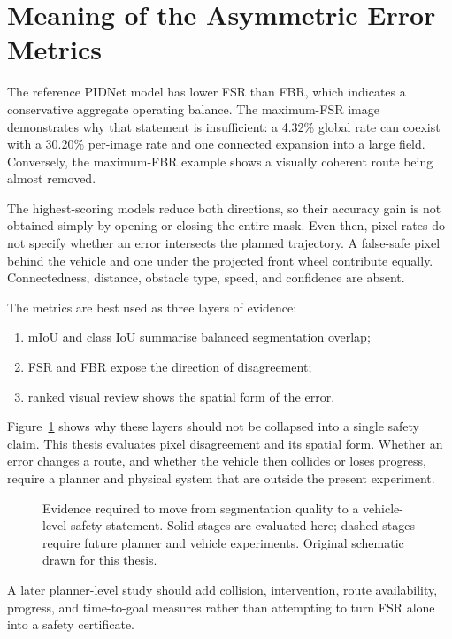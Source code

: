 \section{Meaning of the Asymmetric Error Metrics}

The reference PIDNet model has lower FSR than FBR, which indicates a conservative
aggregate operating balance. The maximum-FSR image demonstrates why that
statement is insufficient: a 4.32\% global rate can coexist with a 30.20\%
per-image rate and one connected expansion into a large field. Conversely, the
maximum-FBR example shows a visually coherent route being almost removed.

The highest-scoring models reduce both directions, so their accuracy gain is not
obtained simply by opening or closing the entire mask. Even then, pixel rates
do not specify whether an error intersects the planned trajectory. A false-safe
pixel behind the vehicle and one under the projected front wheel contribute
equally. Connectedness, distance, obstacle type, speed, and confidence are
absent.

The metrics are best used as three layers of evidence:
\begin{enumerate}
  \item mIoU and class IoU summarise balanced segmentation overlap;
  \item FSR and FBR expose the direction of disagreement;
  \item ranked visual review shows the spatial form of the error.
\end{enumerate}

Figure~\ref{fig:safety_evidence_ladder} shows why these layers should not be
collapsed into a single safety claim. This thesis evaluates pixel disagreement
and its spatial form. Whether an error changes a route, and whether the vehicle
then collides or loses progress, require a planner and physical system that are
outside the present experiment.

\begin{figure}[H]
\centering
\resizebox{\textwidth}{!}{}
\caption[From pixel metrics to vehicle-level evidence.]{Evidence required to
move from segmentation quality to a vehicle-level safety statement. Solid
stages are evaluated here; dashed stages require future planner and vehicle
experiments. Original schematic drawn for this thesis.}
\label{fig:safety_evidence_ladder}
\end{figure}

A later planner-level study should add collision, intervention, route
availability, progress, and time-to-goal measures rather than attempting to
turn FSR alone into a safety certificate.

